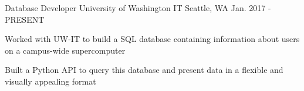 


\begin{cventries}


\cventry
{Database Developer} %
{University of Washington IT} %
{Seattle, WA} %
{Jan. 2017 - PRESENT} %
{ %
\begin{cvitems}
\item {Worked with UW-IT to build a SQL database containing information about users on a campus-wide supercomputer}
\item {Built a Python API to query this database and present data in a flexible and visually appealing format}
\end{cvitems}
}



\end{cventries}
